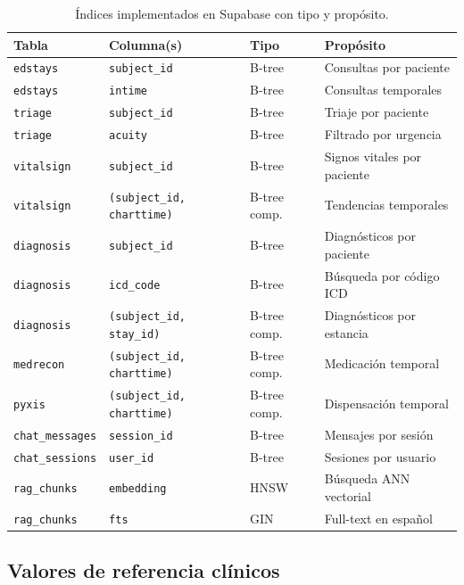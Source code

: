 \begin{table}[H]
\centering
\caption{Índices implementados en Supabase con tipo y propósito.}
\label{tab:appendix_indices}
\footnotesize
\begin{tabularx}{\columnwidth}{lllX}
\toprule
\textbf{Tabla} & \textbf{Columna(s)} & \textbf{Tipo} & \textbf{Propósito} \\
\midrule
\texttt{edstays} & \texttt{subject\_id} & B-tree & Consultas por paciente \\
\texttt{edstays} & \texttt{intime} & B-tree & Consultas temporales \\
\texttt{triage} & \texttt{subject\_id} & B-tree & Triaje por paciente \\
\texttt{triage} & \texttt{acuity} & B-tree & Filtrado por urgencia \\
\texttt{vitalsign} & \texttt{subject\_id} & B-tree & Signos vitales por paciente \\
\texttt{vitalsign} & \texttt{(subject\_id, charttime)} & B-tree comp. & Tendencias temporales \\
\texttt{diagnosis} & \texttt{subject\_id} & B-tree & Diagnósticos por paciente \\
\texttt{diagnosis} & \texttt{icd\_code} & B-tree & Búsqueda por código \ac{ICD} \\
\texttt{diagnosis} & \texttt{(subject\_id, stay\_id)} & B-tree comp. & Diagnósticos por estancia \\
\texttt{medrecon} & \texttt{(subject\_id, charttime)} & B-tree comp. & Medicación temporal \\
\texttt{pyxis} & \texttt{(subject\_id, charttime)} & B-tree comp. & Dispensación temporal \\
\texttt{chat\_messages} & \texttt{session\_id} & B-tree & Mensajes por sesión \\
\texttt{chat\_sessions} & \texttt{user\_id} & B-tree & Sesiones por usuario \\
\texttt{rag\_chunks} & \texttt{embedding} & \ac{HNSW} & Búsqueda ANN vectorial \\
\texttt{rag\_chunks} & \texttt{fts} & \ac{GIN} & Full-text en español \\
\bottomrule
\end{tabularx}
\end{table}

\subsection{Valores de referencia clínicos}

